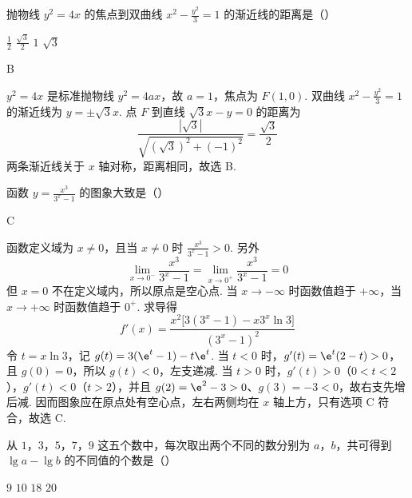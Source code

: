 \begin{problem}
抛物线 \( y^{2} = 4x \) 的焦点到双曲线 \( x^{2} - \frac{y^{2}}{3} = 1 \) 的渐近线的距离是（\quad）

\choices
    {\( \frac{1}{2} \)}
    {\(\frac{\sqrt{3}}{2}\)}
    {\(1\)}
    {\(\sqrt{3}\)}
\end{problem}

\begin{answer}
B
\end{answer}

\begin{solution}
\(y^2=4x\) 是标准抛物线 \(y^2=4ax\)，故 \(a=1\)，焦点为 \(F(1,0)\). 双曲线
\(x^2-\frac{y^2}{3}=1\) 的渐近线为 \(y=\pm\sqrt3x\). 点 \(F\) 到直线 \(\sqrt3x-y=0\) 的距离为
\[
\frac{|\sqrt3|}{\sqrt{(\sqrt3)^2+(-1)^2}}=\frac{\sqrt3}{2}
\]
两条渐近线关于 \(x\) 轴对称，距离相同，故选 B.
\end{solution}

\begin{problem}
函数 \( y = \frac{x^3}{3^{x} - 1} \) 的图象大致是（\quad）

    {}
    {}
    {}
\end{problem}

\begin{answer}
C
\end{answer}

\begin{solution}
函数定义域为 \(x\ne0\)，且当 \(x\ne0\) 时 \(\frac{x^3}{3^x-1}>0\). 另外
\[
\lim_{x\to0^-}\frac{x^3}{3^x-1}=\lim_{x\to0^+}\frac{x^3}{3^x-1}=0
\]
但 \(x=0\) 不在定义域内，所以原点是空心点. 当 \(x\to-\infty\) 时函数值趋于 \(+\infty\)，当 \(x\to+\infty\) 时函数值趋于 \(0^+\). 求导得
\[
f'(x)=\frac{x^2\bigl[3(3^x-1)-x3^x\ln3\bigr]}{(3^x-1)^2}
\]
令 \(t=x\ln3\)，记 \(g(t)=3(\e^t-1)-t\e^t\). 当 \(t<0\) 时，\(g'(t)=\e^t(2-t)>0\)，且 \(g(0)=0\)，所以 \(g(t)<0\)，左支递减. 当 \(t>0\) 时，\(g'(t)>0\)（\(0<t<2\)），\(g'(t)<0\)（\(t>2\)），并且 \(g(2)=\e^2-3>0\)、\(g(3)=-3<0\)，故右支先增后减. 因而图象应在原点处有空心点，左右两侧均在 \(x\) 轴上方，只有选项 C 符合，故选 C.
\end{solution}

\begin{problem}
从 \(1\)，\(3\)，\(5\)，\(7\)，\(9\) 这五个数中，每次取出两个不同的数分别为 \(a\)，\(b\)，共可得到 \( \lg a - \lg b \) 的不同值的个数是（\quad）

\choices
    {\(9\)}
    {\(10\)}
    {\(18\)}
    {\(20\)}
\end{problem}

